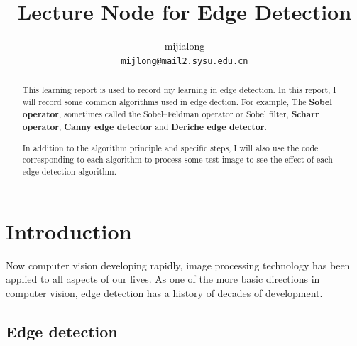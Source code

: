 \documentclass[10pt,twocolumn,letterpaper]{article}
\begin{document}
\title{Lecture Node for Edge Detection}

\author{
	mijialong\\
	{\tt\small mijlong@mail2.sysu.edu.cn}
}

\maketitle

\begin{abstract}
This learning report is used to record my learning in edge detection. 
In this report, I will record some common algorithms used in edge dection.
For example, The {\bf Sobel operator}, sometimes called the Sobel–Feldman 
operator or Sobel filter, {\bf Scharr operator}, {\bf Canny edge detector} 
and {\bf Deriche edge detector}.
	
In addition to the algorithm principle and specific steps, I will also
use the code corresponding to each algorithm to process some test image
to see the effect of each edge detection algorithm.
	
\end{abstract}

\section{Introduction}

Now computer vision developing rapidly, image processing technology has 
been applied to all aspects of our lives. As one of the more basic 
directions in computer vision, edge detection has a history of decades 
of development.

\subsection{Edge detection}
\end{document}
